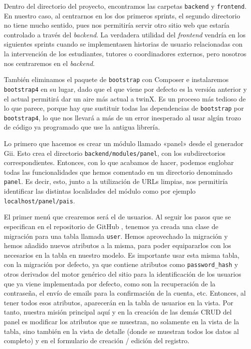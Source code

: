 Dentro del directorio del proyecto, encontramos las carpetas \texttt{backend} y \texttt{frontend}. En nuestro caso, al centrarnos en los dos primeros sprints, el segundo directorio no tiene mucho sentido, pues nos permitiría servir otro sitio web que estaría controlado a través del \textit{backend}. La verdadera utilidad del \textit{frontend} vendría en los siguientes sprints cuando se implementasen historias de usuario relacionadas con la intervención de los estudiantes, tutores o coordinadores externos, pero nosotros nos centraremos en el \textit{backend}.

También eliminamos el paquete de \texttt{bootstrap} con Composer e instalaremos \texttt{bootstrap4} en su lugar, dado que el que viene por defecto es la versión anterior y el actual permitirá dar un aire más actual a twinX. Es un proceso más tedioso de lo que parece, porque hay que sustituir todas las dependencias de \texttt{bootstrap} por \texttt{bootstrap4}, lo que nos llevará a más de un error inesperado al usar algún trozo de código ya programado que use la antigua librería.

Lo primero que hacemos es crear un módulo llamado «panel» desde el generador Gii. Esto crea el directorio \texttt{backend/modules/panel}, con los subdirectorios correspondientes. Entonces, con lo que acabamos de hacer, podemos englobar todas las funcionalidades que hemos comentado en un directorio denominado \texttt{panel}. Es decir, esto, junto a la utilización de URLs limpias, nos permitiría identificar las distintas localidades del módulo como por ejemplo \texttt{localhost/panel/pais}.

El primer menú que crearemos será el de usuarios. Al seguir los pasos que se especifican en el repositorio de GitHub \cite{yii2advanced}, tenemos ya creada una clase de migración para una tabla llamada \texttt{user}. Hemos aprovechado la migración y hemos añadido nuevos atributos a la misma, para poder equipararlos con los necesarios en la tabla en nuestro modelo. Es importante usar esta misma tabla, con la migración por defecto, ya que contiene atributos como \texttt{password\_hash} y otros derivados del motor genérico del sitio para la identificación de los usuarios que ya viene implementada por defecto, como son la recuperación de la contraseña, el envío de emails para la confirmación de la cuenta, etc. Entonces, al tener todos esos atributos, aparecerán en la tabla de usuarios en la vista. Por tanto, nuestra misión principal aquí y en la creación de las demás CRUD del panel es modificar los atributos que se muestran, no solamente en la vista de la tabla, sino también en la vista de detalle (donde se muestran todos los datos al completo) y en el formulario de creación / edición del registro.

